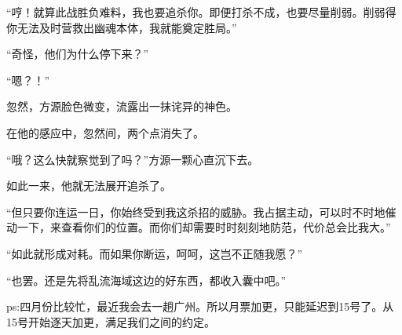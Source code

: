 \begin{this_body}
“哼！就算此战胜负难料，我也要追杀你。即便打杀不成，也要尽量削弱。削弱得你无法及时营救出幽魂本体，我就能奠定胜局。”

“奇怪，他们为什么停下来？”

“嗯？！”

忽然，方源脸色微变，流露出一抹诧异的神色。

在他的感应中，忽然间，两个点消失了。

“哦？这么快就察觉到了吗？”方源一颗心直沉下去。

如此一来，他就无法展开追杀了。

“但只要你连运一日，你始终受到我这杀招的威胁。我占据主动，可以时不时地催动一下，来查看你们的位置。而你们却需要时时刻刻地防范，代价总会比我大。”

“如此就形成对耗。而如果你断运，呵呵，这岂不正随我愿？”

“也罢。还是先将乱流海域这边的好东西，都收入囊中吧。”

ps:四月份比较忙，最近我会去一趟广州。所以月票加更，只能延迟到15号了。从15号开始逐天加更，满足我们之间的约定。

\end{this_body}

